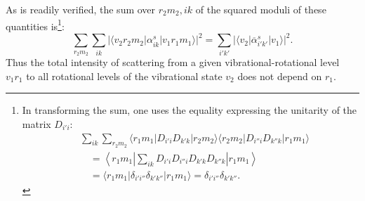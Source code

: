 As is readily verified, the sum over $r_2m_2,ik$ of the squared moduli of these quantities is\footnote{In transforming the sum, one uses the equality expressing the unitarity of the matrix $D_{i'i}$:
\[
\begin{aligned}
&\sum_{ik}\sum_{r_2m_2}
\langle r_1m_1|D_{i'i}D_{k'k}|r_2m_2\rangle
\langle r_2m_2|D_{i''i}D_{k''k}|r_1m_1\rangle\\
&\quad=\left\langle r_1m_1\left|
\sum_{ik}D_{i'i}D_{i''i}D_{k'k}D_{k''k}
\right|r_1m_1\right\rangle\\
&\quad=\langle r_1m_1|\delta_{i'i''}\delta_{k'k''}|r_1m_1\rangle
=\delta_{i'i''}\delta_{k'k''}.
\end{aligned}
\]}:
\begin{equation}
\sum_{r_2m_2}\sum_{ik}
|\langle v_2r_2m_2|\alpha^s_{ik}|v_1r_1m_1\rangle|^2
=\sum_{i'k'}|\langle v_2|\overline\alpha^s_{i'k'}|v_1\rangle|^2.
\tag{61.4}
\end{equation}
Thus the total intensity of scattering from a given vibrational-rotational level $v_1r_1$ to all rotational levels of the vibrational state $v_2$ does not depend on $r_1$.

